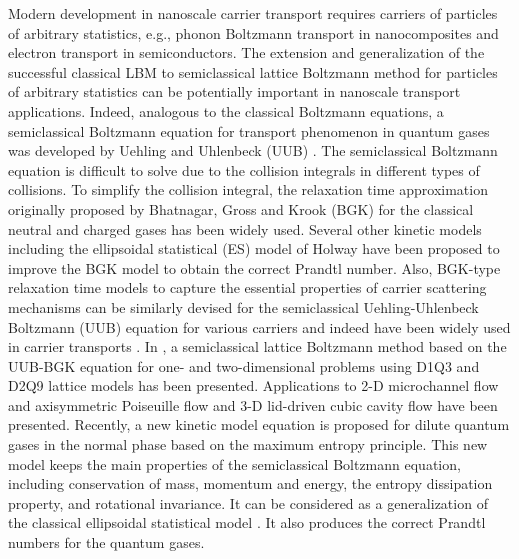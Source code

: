 \documentclass[doublecol]{epl2}
\begin{document}
Modern development in nanoscale carrier transport requires carriers of particles of arbitrary statistics, e.g., phonon Boltzmann transport in nanocomposites and electron transport in semiconductors. The extension and generalization of the successful classical LBM to semiclassical lattice Boltzmann method for particles of arbitrary statistics can be potentially important in nanoscale transport applications.  Indeed, analogous to the classical Boltzmann equations, a semiclassical Boltzmann equation for transport phenomenon in quantum gases was developed by Uehling and Uhlenbeck (UUB) \cite{Ueh1933}.   The semiclassical Boltzmann equation is difficult to solve due to the collision integrals in different types of collisions. To simplify the collision integral, the relaxation time approximation originally proposed by Bhatnagar, Gross and Krook (BGK) \cite{BGK1954} for the classical neutral and charged gases has been widely used.  Several other kinetic models including the ellipsoidal statistical (ES) model of Holway \cite{Holway1966} have been proposed to improve the BGK model to obtain the correct Prandtl number.  Also, BGK-type relaxation time models to capture the essential properties of carrier scattering mechanisms can be similarly devised for the semiclassical Uehling-Uhlenbeck Boltzmann (UUB) equation for various carriers and indeed have been widely used in carrier transports \cite{Lund2000, Chen2005, Kaviany2008}. In \cite{Yang2009}, a semiclassical lattice Boltzmann method based on the UUB-BGK equation for one- and two-dimensional problems using D1Q3 and D2Q9 lattice models has been presented.  Applications to 2-D microchannel flow and axisymmetric Poiseuille flow and 3-D lid-driven cubic cavity flow have been presented.  Recently, a new kinetic model equation is proposed \cite{Wu2012} for dilute quantum gases in the normal phase based on the maximum entropy principle. This new model keeps the main properties of the semiclassical Boltzmann equation, including conservation of mass, momentum and energy, the entropy dissipation property, and rotational invariance. It can be considered as a generalization of the classical ellipsoidal statistical model \cite{Holway1966}. It also produces the correct Prandtl numbers for the quantum gases.
\end{document}
